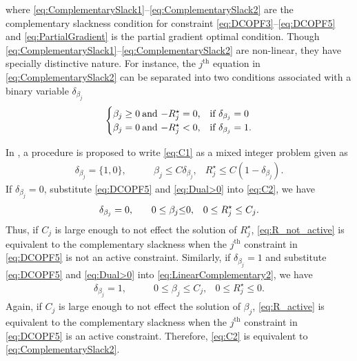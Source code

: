 \documentclass[twocolumn,english,final,journal]{IEEEtran}
\theoremstyle{plain}
\theoremstyle{definition}
\begin{document}
where \eqref{eq:ComplementarySlack1}--\eqref{eq:ComplementarySlack2}
are the complementary slackness condition for constraint \eqref{eq:DCOPF3}--\eqref{eq:DCOPF5}
and \eqref{eq:PartialGradient} is the partial gradient optimal condition.
Though \eqref{eq:ComplementarySlack1}--\eqref{eq:ComplementarySlack2}
are non-linear, they have specially distinctive nature. For instance,
the $j^{\textrm{th}}$ equation in \eqref{eq:ComplementarySlack2}
can be separated into two conditions associated with a binary variable
$\delta_{\beta_{j}}$ 
\begin{equation}
\begin{cases}
\beta_{j}\geq0\:\mbox{and \ensuremath{-R_{j}^{\star}=0},} & \mbox{if }\delta_{\beta_{j}}=0\\
\beta_{j}=0\:\mbox{and \ensuremath{-R_{j}^{\star}<0},} & \mbox{if }\delta_{\beta_{j}}=1.
\end{cases}\label{eq:C1}
\end{equation}


In , a procedure is proposed to write \eqref{eq:C1}
as a mixed integer problem given as
\begin{align}
\delta_{\beta_{j}}= \{1,0\},  &\quad\quad  \beta_{j}\leq C\delta_{\beta_{j}}, &  R_{j}^{\star}\leq C(1-\delta_{\beta_{j}}).\label{eq:C2}
\end{align}
If $\delta_{\beta_{j}}=0$, substitute \eqref{eq:DCOPF5} and \eqref{eq:Dual>0}
into \eqref{eq:C2}, we have 
\begin{align}
\delta_{\beta_{j}}=0, & \quad\quad 0\leq\beta_{j}\text{\ensuremath{\leq}}0, &0\leq R_{j}^{\star}\leq C_{j}.\label{eq:R_not_active}
\end{align}
Thus, if $C_{j}$ is large enough to not effect the solution of $R_{j}^{\star}$,
\eqref{eq:R_not_active} is equivalent to the complementary slackness
when the $j^{\textrm{th}}$ constraint in \eqref{eq:DCOPF5} is not
an active constraint. 
Similarly, if $\delta_{\beta_{j}}=1$ and substitute \eqref{eq:DCOPF5}
and \eqref{eq:Dual>0} into \eqref{eq:LinearComplementary2}, we have
\begin{align}
\delta_{\beta_{j}}=1, & \quad\quad 0\leq\beta_{j}\leq C_{j}, & 0\leq R_{j}^{\star}\leq0.\label{eq:R_active}
\end{align}
Again, if $C_{j}$ is large enough to not effect the solution of $\beta_{j}$,
\eqref{eq:R_active} is equivalent to the complementary slackness
when the $j^{\textrm{th}}$ constraint in \eqref{eq:DCOPF5} is an
active constraint. Therefore, \eqref{eq:C2} is equivalent to \eqref{eq:ComplementarySlack2}.
\end{document}
